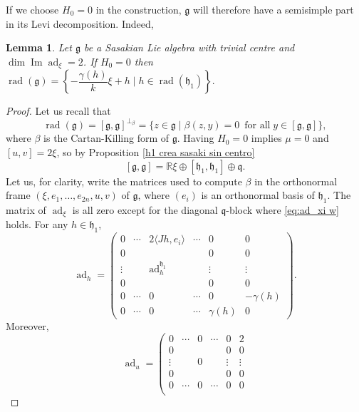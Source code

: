 \documentclass[12pt, twoside]{amsart}
\def\g{\mathfrak{g}}
\def\h{\mathfrak{h}}
\def\q{\mathfrak{q}}
\def\R{\mathbb{R}}
\def\ad{\operatorname{ad}}
\renewcommand{\Im}{\operatorname{Im}}
\def\rad{\operatorname{rad}}
\newtheorem{lemma}[definition]{Lemma}
\theoremstyle{definition}
\begin{document}
If we choose $H_{0}=0$ in the construction, $\g$ will therefore have a semisimple part in its Levi decomposition. Indeed,  

\begin{lemma}\label{lemma: radical}
Let $\g$ be a Sasakian Lie algebra with trivial centre and $\dim \Im \ad_{\xi}=2$. If $H_0=0$ then 
$\rad(\g)= \left\{ -\dfrac{\gamma(h)}{k} \xi+h \mid  h\in \rad(\h_1) \right\}.$
\end{lemma}

\begin{proof}
Let us recall that 
\begin{equation*}\label{radical formula}
       \rad(\g)=[\g,\g]^{\perp _{\beta}}=\{z \in \g \mid \beta(z, y)=0 \, \text{ for all}\; y \in [\g,\g]\},
\end{equation*}
where $\beta$ is the Cartan-Killing form of $\g$.  
 Having $H_0=0$ implies $\mu=0$ and $[u,v]=2\xi$, so by Proposition \ref{h1 crea sasaki sin centro} 
\begin{equation}\label{conmutador de no soluble}
    [\g,\g]=\R\xi \oplus [\h_1, \h_1] \oplus {\q}. 
\end{equation}
Let us, for clarity, write the matrices used to compute $\beta$ in the orthonormal frame $(\xi, e_1,\ldots, e_{2n},u,v)$ of $\g$, where $(e_i)$ is an orthonormal basis of $\h_1$. 
The matrix of $\ad_{\xi}$ is all zero except for the diagonal ${\q}$-block where 
\eqref{eq:ad_xi w} holds.
For any $h\in\h_1$, 
\[
\ad_{h}=
\left(\begin{array}{c|ccc|cc}
          0  &\cdots & 2\langle Jh,e_i\rangle & \cdots &0&0 \\
          \hline 
          0&&& &0&0\\
          \vdots&&\ad^{\h_1}_h&&\vdots&\vdots\\
          0&&&&0&0\\
          \hline
       0 & \cdots & 0 & \cdots &0 & -\gamma(h) \\
        0 & \cdots & 0 & \cdots &\gamma(h) & 0
        \end{array}\right).
\]
Moreover,
\[
\ad_{u}=
\left(\begin{array}{c|ccc|cc}
          0  &\cdots & 0 & \cdots&0&2 \\
          \hline 
          0&&& &0&0\\
          \vdots&&0&&\vdots&\vdots\\
          0&&&&0&0\\
          \hline
       0 & \cdots & 0 & \cdots&0 & 0 \\

\end{array}\]
\end{proof}
\end{document}
